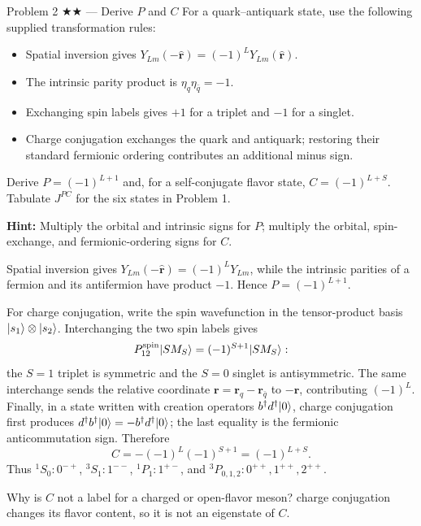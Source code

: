 \documentclass[11pt]{article}
\begin{document}
\begin{problem}{Problem 2 ★★ — Derive $P$ and $C$}
For a quark--antiquark state, use the following supplied transformation rules:
\begin{itemize}
\item Spatial inversion gives $Y_{Lm}(-\widehat{\bm r})=(-1)^LY_{Lm}(\widehat{\bm r})$.
\item The intrinsic parity product is $\eta_q\eta_{\bar q}=-1$.
\item Exchanging spin labels gives $+1$ for a triplet and $-1$ for a singlet.
\item Charge conjugation exchanges the quark and antiquark; restoring their
standard fermionic ordering contributes an additional minus sign.
\end{itemize}
Derive $P=(-1)^{L+1}$ and, for a self-conjugate flavor state,
$C=(-1)^{L+S}$. Tabulate $J^{PC}$ for the six states in Problem 1.

\textbf{Hint:} Multiply the orbital and intrinsic signs for $P$;
multiply the orbital, spin-exchange, and fermionic-ordering signs for $C$.
\end{problem}
\begin{solution}
Spatial inversion gives $Y_{Lm}(-\widehat{\bm r})=(-1)^LY_{Lm}$, while the
intrinsic parities of a fermion and its antifermion have product $-1$. Hence
$P=(-1)^{L+1}$.

For charge conjugation, write the spin wavefunction in the tensor-product basis
$\lvert s_1\rangle\otimes\lvert s_2\rangle$. Interchanging the two spin labels gives
\[
P_{12}^{\rm spin}\lvert S M_S\rangle=(-1)^{S+1}\lvert S M_S\rangle:
\]
the $S=1$ triplet is symmetric and the $S=0$ singlet is antisymmetric. The same
interchange sends the relative coordinate $\bm r=\bm r_q-\bm r_{\bar q}$ to
$-\bm r$, contributing $(-1)^L$. Finally, in a state written with creation
operators $b^\dagger d^\dagger\lvert 0\rangle$, charge conjugation first produces
$d^\dagger b^\dagger\lvert 0\rangle=-b^\dagger d^\dagger\lvert 0\rangle$; the last equality is the
fermionic anticommutation sign. Therefore
\[
C=-(-1)^L(-1)^{S+1}=(-1)^{L+S}.
\]
Thus
$^1S_0:0^{-+}$, $^3S_1:1^{--}$, $^1P_1:1^{+-}$, and
$^3P_{0,1,2}:0^{++},1^{++},2^{++}$.
\end{solution}
\begin{quiz}
Why is $C$ not a label for a charged or open-flavor meson? \answer charge
conjugation changes its flavor content, so it is not an eigenstate of $C$.
\end{quiz}
\end{document}
